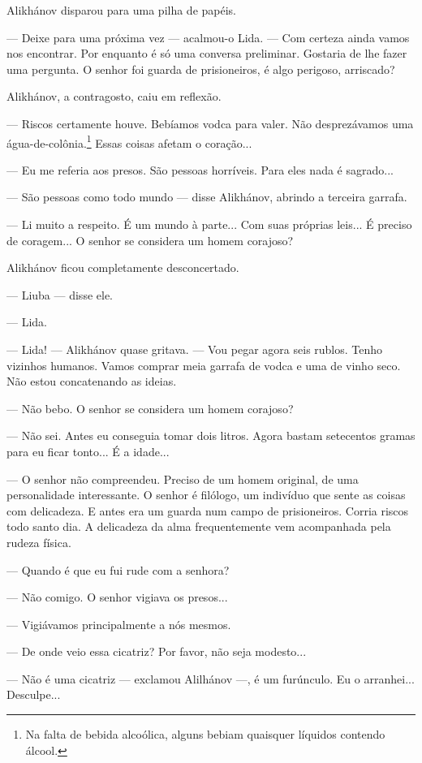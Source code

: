 Alikhánov disparou para uma pilha de papéis.

--- Deixe para uma próxima vez --- acalmou-o Lida. --- Com certeza ainda
vamos nos encontrar. Por enquanto é só uma conversa preliminar. Gostaria
de lhe fazer uma pergunta. O senhor foi guarda de prisioneiros, é algo
perigoso, arriscado?

Alikhánov, a contragosto, caiu em reflexão.

--- Riscos certamente houve. Bebíamos vodca para valer. Não
desprezávamos uma água-de-colônia.\footnote{Na falta de bebida
  alcoólica, alguns bebiam quaisquer líquidos contendo álcool.} Essas
coisas afetam o coração...

--- Eu me referia aos presos. São pessoas horríveis. Para eles nada é
sagrado...

--- São pessoas como todo mundo --- disse Alikhánov, abrindo a terceira
garrafa.

--- Li muito a respeito. É um mundo à parte... Com suas próprias leis...
É preciso de coragem... O senhor se considera um homem corajoso?

Alikhánov ficou completamente desconcertado.

--- Liuba --- disse ele.

--- Lida.

--- Lida! --- Alikhánov quase gritava. --- Vou pegar agora seis rublos.
Tenho vizinhos humanos. Vamos comprar meia garrafa de vodca e uma de
vinho seco. Não estou concatenando as ideias.

--- Não bebo. O senhor se considera um homem corajoso?

--- Não sei. Antes eu conseguia tomar dois litros. Agora bastam
setecentos gramas para eu ficar tonto... É a idade...

--- O senhor não compreendeu. Preciso de um homem original, de uma
personalidade interessante. O senhor é filólogo, um indivíduo que sente
as coisas com delicadeza. E antes era um guarda num campo de
prisioneiros. Corria riscos todo santo dia. A delicadeza da alma
frequentemente vem acompanhada pela rudeza física.

--- Quando é que eu fui rude com a senhora?

--- Não comigo. O senhor vigiava os presos...

--- Vigiávamos principalmente a nós mesmos.

--- De onde veio essa cicatriz? Por favor, não seja modesto...

--- Não é uma cicatriz --- exclamou Alilhánov ---, é um furúnculo. Eu o
arranhei... Desculpe...

